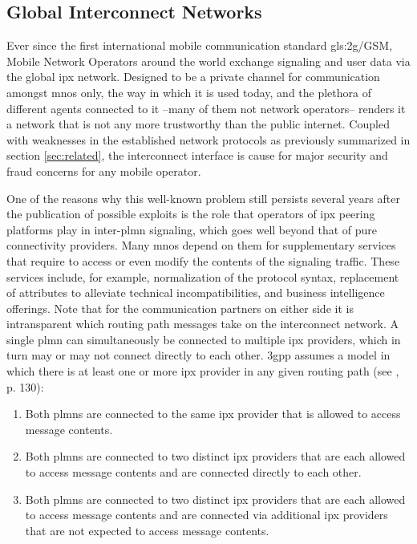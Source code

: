 \subsection{Global Interconnect Networks}

Ever since the first international mobile communication standard \gls{gls:2g}/GSM, Mobile Network Operators around the world exchange signaling and user data via the global \gls{ipx} network.
Designed to be a private channel for communication amongst \glspl{mno} only, the way in which it is used today, and the plethora of different agents connected to it --many of them not network operators-- renders it a network that is not any more trustworthy than the public internet.
Coupled with weaknesses in the established network protocols as previously summarized in section \ref{sec:related}, the interconnect interface is cause for major security and fraud concerns for any mobile operator.

One of the reasons why this well-known problem still persists several years after the publication of possible exploits is the role that operators of \gls{ipx} peering platforms play in inter-\gls{plmn} signaling, which goes well beyond that of pure connectivity providers.
Many \glspl{mno} depend on them for supplementary services that require to access or even modify the contents of the signaling traffic.
These services include, for example, normalization of the protocol syntax, replacement of attributes to alleviate technical incompatibilities, and business intelligence offerings.
Note that for the communication partners on either side it is intransparent which routing path messages take on the interconnect network.
A single \gls{plmn} can simultaneously be connected to multiple \gls{ipx} providers, which in turn may or may not connect directly to each other.
\gls{3gpp} assumes a model in which there is at least one or more \gls{ipx} provider in any given routing path (see \cite{3gpp.33.501}, p. 130):

\begin{enumerate}[label=--]
    \item Both \glspl{plmn} are connected to the same \gls{ipx} provider that is allowed to access message contents.

    \item Both \glspl{plmn} are connected to two distinct \gls{ipx} providers that are each allowed to access message contents and are connected directly to each other.

    \item Both \glspl{plmn} are connected to two distinct \gls{ipx} providers that are each allowed to access message contents and are connected via additional \gls{ipx} providers that are not expected to access message contents.
\end{enumerate}

